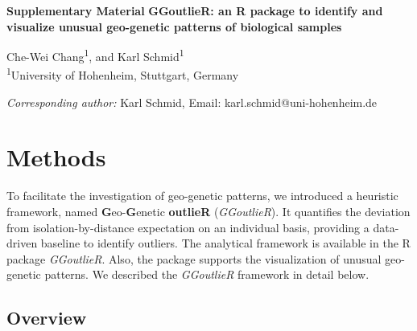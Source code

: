 \documentclass[11pt]{article}
\begin{document}
\begin{flushleft}
\textbf{Supplementary Material}
\textbf{GGoutlieR: an R package to identify and visualize unusual geo-genetic patterns of biological samples}

\vspace{2ex}

Che-Wei Chang\textsuperscript{1}, and Karl Schmid\textsuperscript{1}\\[1ex]

\textsuperscript{1}University of Hohenheim, Stuttgart, Germany\\


\vspace{2ex}

\textit{Corresponding author:} Karl Schmid, Email: karl.schmid@uni-hohenheim.de


\end{flushleft}

\newpage




\section*{Methods}

To facilitate the investigation of geo-genetic patterns, we introduced a heuristic framework, named \textbf{G}eo-\textbf{G}enetic \textbf{outlieR} (\textit{GGoutlieR}).
It quantifies the deviation from isolation-by-distance expectation on an individual basis, providing a data-driven baseline to identify outliers.
The analytical framework is available in the R package \textit{GGoutlieR}.
Also, the package supports the visualization of unusual geo-genetic patterns.
We described the \textit{GGoutlieR} framework in detail below.

\subsection*{Overview}
\end{document}
